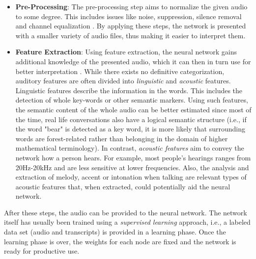 \documentclass[draft,final]{vutinfth} %
\begin{document}
\begin{itemize}
\item \textbf{Pre-Processing}: The pre-processing step aims to normalize the given audio to some degree. This includes issues like noise, suppression, silence removal and channel equalization \cite{9133298}. By applying these steps, the network is presented with a smaller variety of audio files, thus making it easier to interpret them.
\item \textbf{Feature Extraction}: Using feature extraction, the neural network gains additional knowledge of the presented audio, which it can then in turn use for better interpretation \cite{9133298}. While there exists no definitive categorization, auditory features are often divided into \emph{linguistic} and \emph{acoustic} features. Linguistic features describe the information in the words. This includes the detection of whole key-words or other semantic markers. Using such features, the semantic content of the whole audio can be better estimated since most of the time, real life conversations also have a logical semantic structure (i.e., if the word "bear" is detected as a key word, it is more likely that surrounding words are forest-related rather than belonging in the domain of higher mathematical terminology).
In contrast, \emph{acoustic features} aim to convey the network how a person hears. For example, most people's hearings ranges from 20Hz-20kHz and are less sensitive at lower frequencies. Also, the analysis and extraction of melody, accent or intonation when talking are relevant types of acoustic features  that, when extracted, could potentially aid the neural network.
\end{itemize}

After these steps, the audio can be provided to the neural network. The network itself has usually been trained using a \emph{supervised learning} approach, i.e., a labeled data set (audio and transcripts) is provided in a learning phase. Once the learning phase is over, the weights for each node are fixed and the network is ready for productive use.
\end{document}
